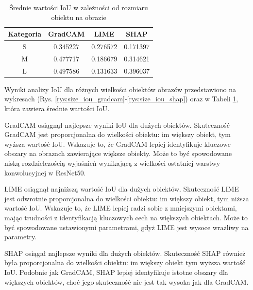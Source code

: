 \begin{table}
	\centering
	\begin{tabular}{|c|c|c|c|}
		\hline
		\textbf{Kategoria} & \textbf{GradCAM} & \textbf{LIME} & \textbf{SHAP} \\
		\hline
		S                  & 0.345227         & 0.276572      & 0.171397      \\
		\hline
		M                  & 0.477717         & 0.186679      & 0.314621      \\
		\hline
		L                  & 0.497586         & 0.131633      & 0.396037      \\
		\hline
	\end{tabular}
	\caption{Średnie wartości IoU w zależności od rozmiaru obiektu na obrazie}
	\label{tab:size_iou}
\end{table}

Wyniki analizy IoU dla różnych wielkości obiektów obrazów przedstawiono na wykresach (Rys. \ref{rys:size_iou_gradcam}-\ref{rys:size_iou_shap}) oraz w Tabeli \ref{tab:size_iou}, która zawiera średnie wartości IoU.

GradCAM osiągnął najlepsze wyniki IoU dla dużych obiektów.
Skuteczność GradCAM jest proporcjonalna do wielkości obiektu: im większy obiekt, tym wyższa wartość IoU.
Wskazuje to, że GradCAM lepiej identyfikuje kluczowe obszary na obrazach zawierające większe obiekty.
Może to być spowodowane niską rozdzielczością wyjaśnień wynikającą z wielkości ostatniej warstwy konwolucyjnej w ResNet50.

LIME osiągnął najniższą wartość IoU dla dużych obiektów.
Skuteczność LIME jest odwrotnie proporcjonalna do wielkości obiektu:  im większy obiekt, tym niższa wartość IoU.
Wskazuje to, że LIME lepiej radzi sobie z mniejszymi obiektami, mając trudności z identyfikacją kluczowych cech na większych obiektach.
Może to być spowodowane ustawionymi parametrami, gdyż LIME jest wysoce wrażliwy na parametry.

SHAP osiągał najlepsze wyniki dla dużych obiektów.
Skuteczność SHAP również była proporcjonalna do wielkości obiektu: im większy obiekt tym wyższa wartość IoU.
Podobnie jak GradCAM, SHAP lepiej identyfikuje istotne obszary dla większych obiektów, choć jego skuteczność nie jest tak wysoka jak dla GradCAM.

